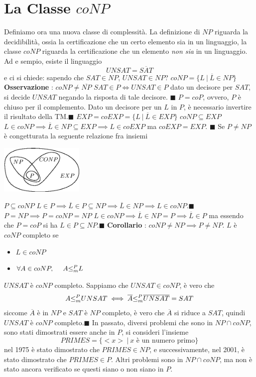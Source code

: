 \documentclass[10pt, letterpaper]{report}
\begin{document}
\section{La Classe $coNP$}
Definiamo ora una nuova classe di complessità. La definizione di $NP$ riguarda la decidibilità, ossia la certificazione che un certo elemento sia in un linguaggio, la classe $coNP$ riguarda la certificazione che un elemento \textit{non sia} in un linguaggio.\acc 
Ad e sempio, esiste il linguaggio $$ UNSAT=\overline{SAT}$$
e ci si chiede: sapendo che $SAT\in NP$, $UNSAT\in NP$?\acc 
{} $coNP=\{L \ | \ \overline{L}\in NP\}$\acc 
\textbf{Osservazione} : $coNP \ne \overline{NP}$\acc 
\teo{} $SAT\in P \iff UNSAT \in P$\acc 
\dimo{} dato un decisore per $SAT$, si decide $UNSAT$ negando la risposta di tale decisore.
\hfill$\blacksquare$\acc  
\teo{} $P=coP$, ovvero, $P$ è chiuso per il complemento.\acc 
\dimo{} Dato un decisore per un $L$ in $P$, è necessario invertire il risultato della TM.\hfill$\blacksquare$\acc  
\prop{} $EXP=coEXP=\{L \ | \ \overline L \in EXP\}$ \acc 
\teo{} $coNP\subseteq EXP$\acc 
\dimo{} $L\in coNP \implies \overline L \in NP \subseteq EXP \implies L\in coEXP$ ma $coEXP=EXP$.
\hfill$\blacksquare$\acc  
Se $P\ne NP$ è congetturata la seguente relazione fra insiemi
\begin{center}
    \includegraphics[width=0.3\textwidth ]{images/coNP.eps}
\end{center}
\teo{} $P\subseteq coNP$\acc 
\dimo{} $L\in P\implies \overline L \in P \subseteq NP \implies 
\overline L \in NP \implies L\in coNP$.\hfill$\blacksquare$\acc  
\teo{} $P=NP\implies P=coNP=NP$\acc 
\dimo{} $L\in coNP\implies \overline L \in NP=P \implies \overline L \in P $ ma essendo che $P=coP$ si ha $L \in P\subseteq NP$.\hfill$\blacksquare$\acc   
\textbf{Corollario} : $coNP\ne NP\implies P \ne NP$.\acc
{} $L$ è $coNP$ completo se\begin{itemize}
    \item $L\in coNP$
    \item $\forall A \in coNP, \ \ \ \ A{\le_m^P} L$
\end{itemize} 
\teo{} $UNSAT$ è $coNP$ completo.\acc 
\dimo{} Sappiamo che $UNSAT\in coNP$, è vero che 
$$ A{\le_m^P} UNSAT \iff \overline A {\le_m^P} \overline{UNSAT}=SAT$$
siccome $\overline A$ è in $NP$ e $SAT$ è $NP$ completo, è vero che $\overline A$ si riduce a $SAT$, quindi $UNSAT$ è $coNP$ completo.\hfill$\blacksquare$\acc  
In passato, diversi problemi che sono in $NP\cap coNP$, sono stati dimostrati essere anche in $P$, si consideri l'insieme 
$$ PRIMES=\{<x> \ | \ x\text{ è un numero primo}\}$$
nel 1975 è stato dimostrato che $PRIMES\in NP$, e successivamente, nel 2001, è stato dimostrato che $PRIMES\in P$. Altri problemi sono in $NP\cap coNP$, ma non è stato ancora verificato se questi siano o non siano in $P$.
\end{document}
